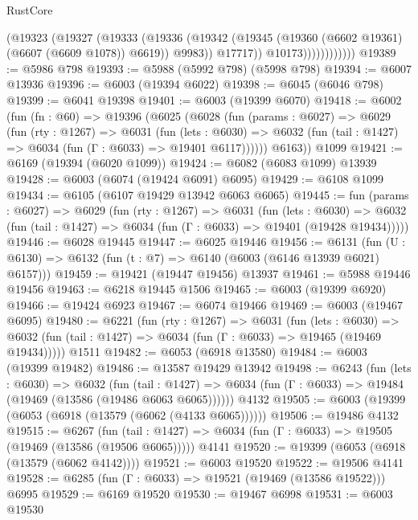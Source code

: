 \begin{lexlean}{RustCore}
\begin{coremodule}
                          (@19323
                            (@19327
                              (@19333
                                (@19336
                                  (@19342
                                    (@19345 (@19360 (@6602 @19361) (@6607 (@6609 @1078)) @6619))
                                    @9983))
                                @17717))
                            @10173))))))))))))
@19389 := @5986 @798
@19393 := @5988 (@5992 @798) (@5998 @798)
@19394 := @6007 @13936
@19396 := @6003 (@19394 @6022)
@19398 := @6045 (@6046 @798)
@19399 := @6041 @19398
@19401 := @6003 (@19399 @6070)
@19418 := @6002
    (fun (fn : @60) =>
    @19396
      (@6025
        (@6028
          (fun (params : @6027) =>
          @6029
            (fun (rty : @1267) =>
            @6031
              (fun (lets : @6030) =>
              @6032 (fun (tail : @1427) => @6034 (fun (Γ : @6033) => @19401 @6117))))))
        @6163))
    @1099
@19421 := @6169 (@19394 (@6020 @1099))
@19424 := @6082 (@6083 @1099) @13939
@19428 := @6003 (@6074 (@19424 @6091) @6095)
@19429 := @6108 @1099
@19434 := @6105 (@6107 @19429 @13942 @6063 @6065)
@19445 := fun (params : @6027) =>
  @6029
    (fun (rty : @1267) =>
    @6031
      (fun (lets : @6030) =>
      @6032 (fun (tail : @1427) => @6034 (fun (Γ : @6033) => @19401 (@19428 @19434)))))
@19446 := @6028 @19445
@19447 := @6025 @19446
@19456 := @6131
    (fun (U : @6130) => @6132 (fun (t : @7) => @6140 (@6003 (@6146 @13939 @6021) @6157)))
@19459 := @19421 (@19447 @19456) @13937
@19461 := @5988 @19446 @19456
@19463 := @6218 @19445 @1506
@19465 := @6003 (@19399 @6920)
@19466 := @19424 @6923
@19467 := @6074 @19466
@19469 := @6003 (@19467 @6095)
@19480 := @6221
    (fun (rty : @1267) =>
    @6031
      (fun (lets : @6030) =>
      @6032 (fun (tail : @1427) => @6034 (fun (Γ : @6033) => @19465 (@19469 @19434)))))
    @1511
@19482 := @6053 (@6918 @13580)
@19484 := @6003 (@19399 @19482)
@19486 := @13587 @19429 @13942
@19498 := @6243
    (fun (lets : @6030) =>
    @6032
      (fun (tail : @1427) =>
      @6034 (fun (Γ : @6033) => @19484 (@19469 (@13586 (@19486 @6063 @6065))))))
    @4132
@19505 := @6003 (@19399 (@6053 (@6918 (@13579 (@6062 (@4133 @6065))))))
@19506 := @19486 @4132
@19515 := @6267
    (fun (tail : @1427) => @6034 (fun (Γ : @6033) => @19505 (@19469 (@13586 (@19506 @6065)))))
    @4141
@19520 := @19399 (@6053 (@6918 (@13579 (@6062 @4142))))
@19521 := @6003 @19520
@19522 := @19506 @4141
@19528 := @6285 (fun (Γ : @6033) => @19521 (@19469 (@13586 @19522))) @6995
@19529 := @6169 @19520
@19530 := @19467 @6998
@19531 := @6003 @19530

\end{coremodule}
\end{lexlean}
